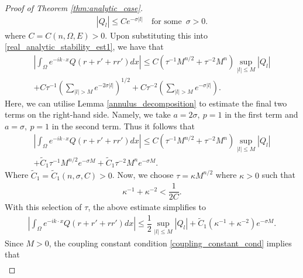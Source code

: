 \documentclass[a4paper, 11pt, twoside, notitlepage]{amsart}
\theoremstyle{definition}
\theoremstyle{remark}
\newcommand{\f}[1]{\footnote{\textcolor{blue}{#1}}}
\begin{document}
\begin{proof}[Proof of Theorem \ref{thm:analytic_case}]
\begin{align*}
    |Q_l|\leq Ce^{-\sigma |l|} \quad \text{for some} \;\ \sigma>0.
\end{align*}
where $C=C(n,\Omega,E)>0$. Upon substituting this into \eqref{real_analytic_stability_est1}, we have that %
\begin{multline*}
        \left|\int_\Omega e^{-ik\cdot x}Q(r+r'+rr')dx\right| \leq C(\tau^{-1}M^{n/2}+\tau^{-2}M^n)\sup_{|l|\leq M}|Q_l|\\+C\tau^{-1}\left(\sum_{|l|>M}e^{-2\sigma|l|}\right)^{1/2}+C\tau^{-2}\left(\sum_{|l|>M}e^{-\sigma|l|}\right). 
\end{multline*}
Here, we can utilise Lemma \ref{annulus_decomposition} to estimate the final two terms on the right-hand side. Namely, we take $a=2\sigma,\ p=1$ in the first term and $a=\sigma,\ p=1$ in the second term. Thus it follows that
\begin{multline*}
        \left|\int_\Omega e^{-ik\cdot x}Q(r+r'+rr')dx\right| \leq C(\tau^{-1}M^{n/2}+\tau^{-2}M^n)\sup_{|l|\leq M}|Q_l|\\+\widetilde{C}_1\tau^{-1}M^{n/2}e^{-\sigma M}+\widetilde{C}_1\tau^{-2}M^{n}e^{-\sigma M}. 
\end{multline*}
Where $\widetilde{C}_1=\widetilde{C}_1(n,\sigma,C)>0$. Now, we choose $\tau=\kappa M^{n/2}$ where $\kappa>0$ such that 
\begin{align}\label{coupling_constant_cond}
    \kappa^{-1}+\kappa^{-2}<\dfrac{1}{2C}.
\end{align}
With this selection of $\tau$, the above estimate simplifies to 
\begin{align*}
    \left|\int_\Omega e^{-ik\cdot x}Q(r+r'+rr')dx\right| \leq \dfrac{1}{2}\sup_{|l|\leq M}|Q_l|+\widetilde{C}_1\left(\kappa^{-1}+\kappa^{-2}\right)e^{-\sigma M}.
\end{align*}
Since $M>0$, the coupling constant condition \eqref{coupling_constant_cond} implies that 
\begin{align*}

\end{align*}
\end{proof}
\end{document}
